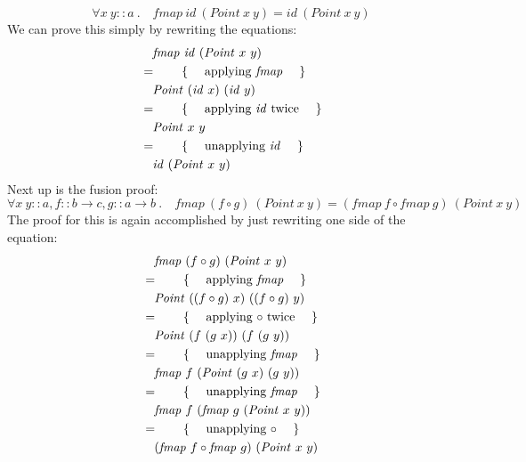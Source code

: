 \begin{displaymath}
\forall x~y :: \mathit{a}~. \quad \mathit{fmap}~\mathit{id}~(\mathit{Point}~x~y) = \mathit{id}~(\mathit{Point}~x~y)
\end{displaymath}
We can prove this simply by rewriting the equations:
\begin{align*}
&\quad \mathit{fmap}~\mathit{id}~(\mathit{Point}~x~y)\\
&=\qquad\text{\{\quad\ applying $\mathit{fmap}$ \quad\}}\\
&\quad \mathit{Point}~(\mathit{id}~x)~(\mathit{id}~y)\\
&=\qquad\text{\{\quad\ applying $\mathit{id}$ twice \quad\}}\\
&\quad \mathit{Point}~x~y\\
&=\qquad\text{\{\quad\ unapplying $\mathit{id}$ \quad\}}\\
&\quad \mathit{id}~(\mathit{Point}~x~y)
\end{align*}
Next up is the fusion proof:
\begin{displaymath}
\forall x~y :: \mathit{a}, f :: b \to c, g :: a \to b~. \quad \mathit{fmap}~(f \circ g)~(\mathit{Point}~x~y) = (\mathit{fmap}~f \circ \mathit{fmap}~g)~(\mathit{Point}~x~y)
\end{displaymath}
The proof for this is again accomplished by just rewriting one side of the equation:
\begin{align*}
&\quad \mathit{fmap}~(f \circ g)~(\mathit{Point}~x~y)\\
&=\qquad\text{\{\quad\ applying $\mathit{fmap}$ \quad\}}\\
&\quad \mathit{Point}~((f \circ g)~x)~((f \circ g)~y)\\
&=\qquad\text{\{\quad\ applying $\circ$ twice \quad\}}\\
&\quad \mathit{Point}~(f~(g~x))~(f~(g~y))\\
&=\qquad\text{\{\quad\ unapplying $\mathit{fmap}$ \quad\}}\\
&\quad \mathit{fmap}~f~(\mathit{Point}~(g~x)~(g~y))\\
&=\qquad\text{\{\quad\ unapplying $\mathit{fmap}$ \quad\}}\\
&\quad \mathit{fmap}~f~(\mathit{fmap}~g~(\mathit{Point}~x~y))\\
&=\qquad\text{\{\quad\ unapplying $\circ$ \quad\}}\\
&\quad (\mathit{fmap}~f \circ \mathit{fmap}~g)~(\mathit{Point}~x~y)
\end{align*}

